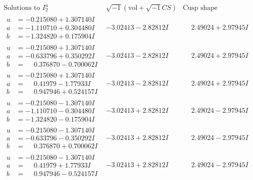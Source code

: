 \documentclass[1p]{elsarticle_modified}
\theoremstyle{definition}
\newcommand{\I}{\sqrt{-1}}
\begin{document}
$$\begin{array}{c|c|c}  
\text{Solutions to }I^u_{2}& \I (\text{vol} + \sqrt{-1}CS) & \text{Cusp shape}\\
 \hline 
\begin{aligned}
u &= -0.215080 + 1.307140 I \\
a &= -1.110710 + 0.304480 I \\
b &= -1.324820 + 0.175904 I\end{aligned}
 & -3.02413 - 2.82812 I & \phantom{-}2.49024 + 2.97945 I \\ \hline\begin{aligned}
u &= -0.215080 + 1.307140 I \\
a &= -0.633796 + 0.350292 I \\
b &= \phantom{-}0.376870 - 0.700062 I\end{aligned}
 & -3.02413 - 2.82812 I & \phantom{-}2.49024 + 2.97945 I \\ \hline\begin{aligned}
u &= -0.215080 + 1.307140 I \\
a &= \phantom{-}0.41979 - 1.77933 I \\
b &= \phantom{-}0.947946 + 0.524157 I\end{aligned}
 & -3.02413 - 2.82812 I & \phantom{-}2.49024 + 2.97945 I \\ \hline\begin{aligned}
u &= -0.215080 - 1.307140 I \\
a &= -1.110710 - 0.304480 I \\
b &= -1.324820 - 0.175904 I\end{aligned}
 & -3.02413 + 2.82812 I & \phantom{-}2.49024 - 2.97945 I \\ \hline\begin{aligned}
u &= -0.215080 - 1.307140 I \\
a &= -0.633796 - 0.350292 I \\
b &= \phantom{-}0.376870 + 0.700062 I\end{aligned}
 & -3.02413 + 2.82812 I & \phantom{-}2.49024 - 2.97945 I \\ \hline\begin{aligned}
u &= -0.215080 - 1.307140 I \\
a &= \phantom{-}0.41979 + 1.77933 I \\
b &= \phantom{-}0.947946 - 0.524157 I\end{aligned}
 & -3.02413 + 2.82812 I & \phantom{-}2.49024 - 2.97945 I \\ \hline\begin{aligned}

\end{aligned}
\end{array}$$
\end{document}
